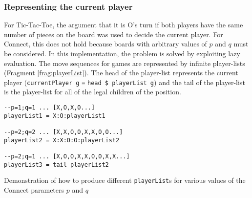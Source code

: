 \subsubsection{Representing the current player}
For {Tic-Tac-Toe}, the argument that it is O's turn if both players have the same number of pieces on the board was used to decide the current player. For Connect, this does not hold because boards with arbitrary values of $p$ and $q$ must be considered. In this implementation, the problem is solved by exploiting lazy evaluation. The move sequences for games are represented by infinite player-lists (Fragment \ref{frag:playerList}). The head of the player-list represents the current player (\texttt{currentPlayer g} \texttt{=} \texttt{head \$ playerList g}) and the tail of the player-list is the player-list for all of the legal children of the position.
\begin{fragment}
\begin{lstlisting}
--p=1;q=1 ... [X,O,X,O...]
playerList1 = X:O:playerList1

--p=2;q=2 ... [X,X,O,O,X,X,O,O...]
playerList2 = X:X:O:O:playerList2

--p=2;q=1 ... [X,O,O,X,X,O,O,X,X...]
playerList3 = tail playerList2
\end{lstlisting}
\caption{Demonstration of how to produce different \texttt{playerList}s for various values of the {Connect} parameters $p$ and $q$\label{frag:playerList}}
\end{fragment}



